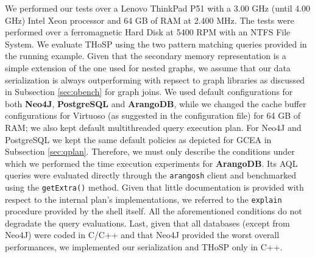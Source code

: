 We performed our tests over a Lenovo ThinkPad P51 with a 3.00 GHz (until 4.00 GHz) Intel Xeon processor and 64 GB of RAM at 2.400 MHz. The tests were performed over a ferromagnetic Hard Disk at 5400 RPM with an NTFS File System. We evaluate THoSP using the two pattern matching queries provided in the running example. Given that the secondary memory representation is a simple extension of the one used for nested graphs, we assume that our data serialization is always outperforming with repsect to graph libraries as discussed in Subsection \vref{sec:qbench} for graph joins. We used default configurations for both \textbf{Neo4J}, \textbf{PostgreSQL} and \textbf{ArangoDB}, while we changed the cache buffer configurations for Virtuoso (as suggested in the configuration file) for 64 GB of RAM; we also kept  default multithreaded query execution plan. For Neo4J and PostgreSQL we kept the same default policies as depicted for  GCEA in Subsection \vref{sec:qplan}. Therefore, we must only describe the conditions under which we performed the time execution experiments for \textbf{ArangoDB}. Its AQL queries were evaluated directly through the \texttt{arangosh} client and benchmarked using the \texttt{getExtra()} method. Given that little documentation is provided with respect to the internal plan's implementations, we referred to the \texttt{explain} procedure provided by the shell itself. All the aforementioned conditions do not degradate the query evaluations. Last, given that all databases (except from Neo4J) were coded in C/C++ and that Neo4J provided the worst overall performances, we implemented our serialization and THoSP only in C++.



